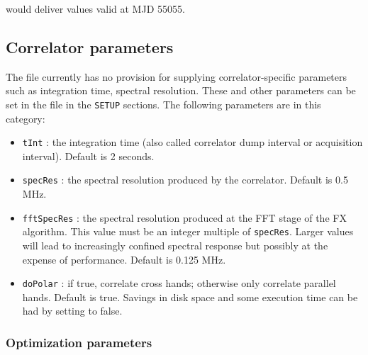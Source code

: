 \documentclass[12pt]{article}
\begin{document}
\noindent
would deliver values valid at MJD 55055.

\subsection{Correlator parameters}

The \vx file currently has no provision for supplying correlator-specific parameters such as integration time, spectral resolution.
These and other parameters can be set in the \vd file in the {\tt SETUP} sections.
The following parameters are in this category:
\begin{itemize}
\item {\tt tInt} : the integration time (also called correlator dump interval or acquisition interval).  Default is 2 seconds.
\item {\tt specRes} : the spectral resolution produced by the correlator.  Default is 0.5 MHz.
\item {\tt fftSpecRes} : the spectral resolution produced at the FFT stage of the FX algorithm.  This value must be an integer multiple of {\tt specRes}.  Larger values will lead to increasingly confined spectral response but possibly at the expense of performance.  Default is 0.125 MHz.
\item {\tt doPolar} : if true, correlate cross hands; otherwise only correlate parallel hands.  Default is true.  Savings in disk space and some execution time can be had by setting to false.

\end{itemize}

\subsubsection{Optimization parameters}
\end{document}
